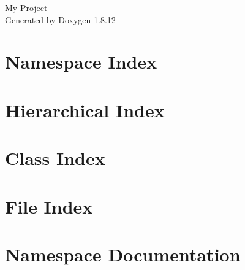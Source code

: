 \documentclass[twoside]{book}
\newcommand{\+}{\discretionary{\mbox{\scriptsize$\hookleftarrow$}}{}{}}
\newcommand{\clearemptydoublepage}{%
  \newpage{\pagestyle{empty}\cleardoublepage}%
}
\begin{document}
\hypersetup{pageanchor=false,
             bookmarksnumbered=true,
             pdfencoding=unicode
            }
\begin{titlepage}
\vspace*{7cm}
\begin{center}%
{\Large My Project }\\
\vspace*{1cm}
{\large Generated by Doxygen 1.8.12}\\
\end{center}
\end{titlepage}
\clearemptydoublepage
{}
\tableofcontents
\clearemptydoublepage
{}
\hypersetup{pageanchor=true}

\chapter{Namespace Index}

\chapter{Hierarchical Index}

\chapter{Class Index}

\chapter{File Index}

\chapter{Namespace Documentation}






\end{document}
